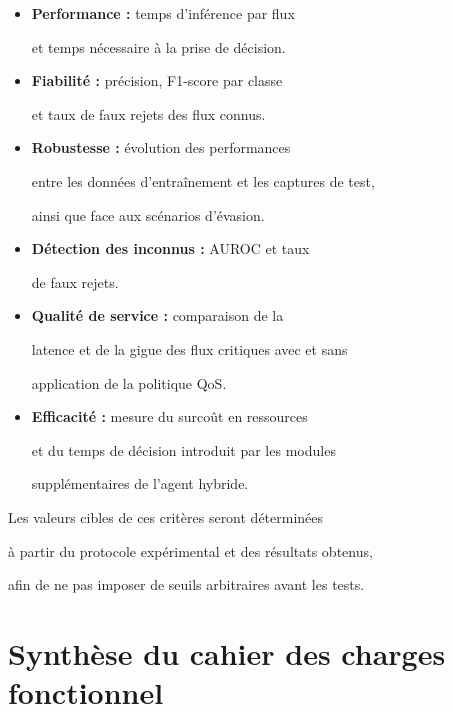 \begin{itemize}

    \item \textbf{Performance :} temps d'inférence par flux

    et temps nécessaire à la prise de décision.



    \item \textbf{Fiabilité :} précision, F1-score par classe

    et taux de faux rejets des flux connus.



    \item \textbf{Robustesse :} évolution des performances

    entre les données d'entraînement et les captures de test,

    ainsi que face aux scénarios d'évasion.



    \item \textbf{Détection des inconnus :} AUROC et taux

    de faux rejets.



    \item \textbf{Qualité de service :} comparaison de la

    latence et de la gigue des flux critiques avec et sans

    application de la politique QoS.



    \item \textbf{Efficacité :} mesure du surcoût en ressources

    et du temps de décision introduit par les modules

    supplémentaires de l'agent hybride.

\end{itemize}



Les valeurs cibles de ces critères seront déterminées

à partir du protocole expérimental et des résultats obtenus,

afin de ne pas imposer de seuils arbitraires avant les tests.






\section{Synthèse du cahier des charges fonctionnel}

